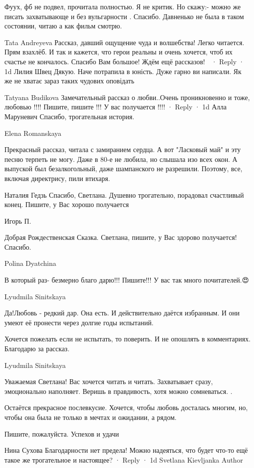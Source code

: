 Фуух, фб не подвел, прочитала полностью.
Я не критик. Но скажу:- можно же писать захватывающе и без вульгарности .
Спасибо.
Давненько не была в таком состоянии, читаю а как фильм смотрю.

Tata Andreyeva
Рассказ, давший ощущение чуда и волшебства! Легко читается. Прям взахлёб. И так и кажется, что герои реальны и очень хочется, чтоб их счастье не кончалось. Спасибо Вам большое! Ждём ещё рассказов! 👏
 · Reply · 1d
Лилия Швец
Дякую. Наче потрапила в юність. Дуже гарно ви написали. Як же не хватає зараз таких чудових оповідать

Tatyana Budikova
Замечательный рассказ о любви..Очень проникновенно и тоже, любовью !!!! Пишите, пишите !!! У вас получается !!!!
 · Reply · 1d
Алла Маруневич
Спасибо, трогательная история.

Elena Romanskaya

Прекрасный рассказ, читала с замиранием сердца. А вот "Ласковый май" и эту
песню терпеть не могу. Даже в 80-е не любила, но слышала изо всех окон. А
выпуской был безалкогольный, даже шампанского не разрешили. Поэтому, все,
включая директрису, пили втихаря.

Наталия Гедзь
Спасибо, Светлана. Душевно трогательно, порадовал счастливый конец. Пишите, у Вас хорошо получается

Игорь П.

Добрая Рождественская Сказка. Светлана, пишите, у Вас здорово получается! Спасибо.

Polina Dyatchina

В который раз- безмерно благо дарю!!! Пишите!!! У вас так много почитателей.😍

Lyudmila Sinitskaya

Да!Любовь - редкий дар. Она есть. И действительно даётся избранным. И они умеют
её пронести через долгие годы испытаний.

Хочется пожелать если не испытать, то поверить. И не опошлять в комментариях.
Благодарю за рассказ.

Lyudmila Sinitskaya

Уважаемая Светлана! Вас хочется читать и читать. Захватывает сразу,
эмоционально наполняет. Веришь в правдивость, хотя можно сомневаться. .

Остаётся прекрасное послевкусие. Хочется, чтобы любовь досталась многим, но,
чтобы она была не только в мечтах и ожидании, а рядом.

Пишите, пожалуйста. Успехов и удачи

Нина Сухова
Благодарности нет предела! Можно надеяться, что будет что-то ещё такое же трогательное и настоящее?
 · Reply · 1d
Svetlana Kievljanka
Author


